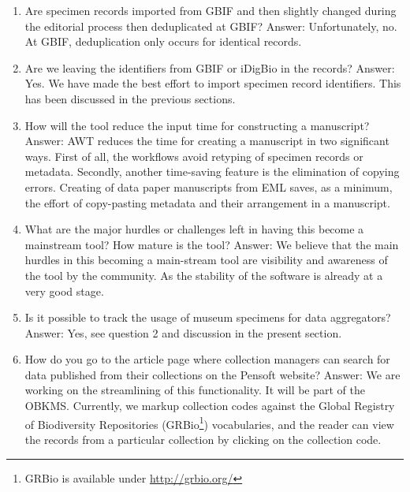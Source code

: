 \begin{enumerate}
\item{Are specimen records imported from GBIF and then slightly changed during the editorial process then deduplicated at GBIF? Answer: Unfortunately, no. At GBIF, deduplication only occurs for identical records.}
\item{Are we leaving the identifiers from GBIF or iDigBio in the records? Answer: Yes. We have made the best effort to import specimen record identifiers. This has been discussed in the previous sections.}
\item{How will the tool reduce the input time for constructing a manuscript? Answer: AWT reduces the time for creating a manuscript in two significant ways. First of all, the workflows avoid retyping of specimen records or metadata. Secondly, another time-saving feature is the elimination of copying errors. Creating of data paper manuscripts from EML saves, as a minimum, the effort of copy-pasting metadata and their arrangement in a manuscript.}
\item{What are the major hurdles or challenges left in having this become a mainstream tool? How mature is the tool? Answer: We believe that the main hurdles in this becoming a main-stream tool are visibility and awareness of the tool by the community. As the stability of the software is already at a very good stage.}
\item{Is it possible to track the usage of museum specimens for data aggregators? Answer: Yes, see question 2 and discussion in the present section.}
\item{How do you go to the article page where collection managers can search for data published from their collections on the Pensoft website? Answer: We are working on the streamlining of this functionality. It will be part of the OBKMS. Currently, we markup collection codes against the Global Registry of Biodiversity Repositories (GRBio\footnote{GRBio is available under \url{http://grbio.org/}}) vocabularies, and the reader can view the records from a particular collection by clicking on the collection code.}
\end{enumerate}